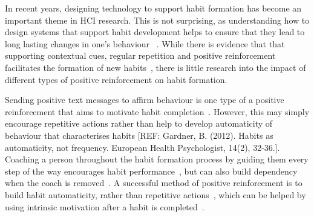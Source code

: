 \documentclass{scaffold/sigchi}
\begin{document}
In recent years, designing technology to support habit formation has become an important theme in HCI research. This is not surprising, as understanding how to design systems that support habit development helps to ensure that they lead to long lasting changes in one's behaviour ~\cite{how_to_evaluate_tech_for_behaviour_change}. While there is evidence that that supporting contextual cues, regular repetition and positive reinforcement facilitates the formation of new habits~\cite{article_beyond_self_tracking_designing_apps}, there is little research into the impact of different types of positive reinforcement on habit formation.



Sending positive text messages to affirm behaviour is one type of a positive reinforcement that aims to motivate habit completion~\cite{chi_crowd_designed_motivation}. However, this may simply encourage repetitive actions rather than help to develop automaticity of behaviour that characterises habits [REF: Gardner, B. (2012). Habits as automaticity, not frequency. European Health Psychologist, 14(2), 32-36.]. Coaching a person throughout the habit formation process by guiding them every step of the way encourages habit performance~\cite{coaching_not_that_good}, but can also build dependency when the coach is removed~\cite{article_dont_kick_habit, article_realtime_feedback_improving_medication_taking}. A successful method of positive reinforcement is to build habit automaticity, rather than repetitive actions~\cite{article_beyond_self_tracking_designing_apps}, which can be helped by using intrinsic motivation after a habit is completed~\cite{article_a_self_efficacy, article_meta_analytic_review_intrinsic_motivation}.
\end{document}
